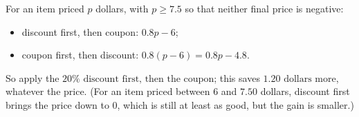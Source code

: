 For an item priced $p$ dollars, with $p\ge7.5$ so that neither final price is negative:
\begin{itemize}
\item discount first, then coupon: $0.8p-6$;
\item coupon first, then discount: $0.8(p-6)=0.8p-4.8$.
\end{itemize}
So apply the $\boxed{20\%\text{ discount first, then the coupon}}$; this saves $\boxed{1.20\text{ dollars}}$ more, whatever the price. (For an item priced between $6$ and $7.50$ dollars, discount first brings the price down to $0$, which is still at least as good, but the gain is smaller.)
